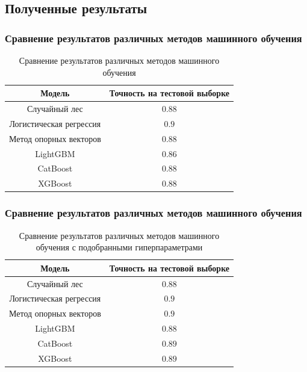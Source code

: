 \documentclass{beamer}
\begin{document}
		\subsection{Полученные результаты}
		\begin{frame}
			\frametitle{Сравнение результатов различных методов машинного обучения}
			\begin{center}
				\begin{table}[!htbp]
					\centering
					\begin{tabular}{ |c|c| }
						\hline
						Модель & Точность на тестовой выборке \\ 
						\hline
						Случайный лес & $0.88$  \\ 
						Логистическая регрессия & $0.9$ \\ 
						Метод опорных векторов & $0.88$  \\
						LightGBM & $0.86$ \\
						CatBoost & $0.88$ \\
						XGBoost & $0.88$  \\
						\hline
					\end{tabular}
					\caption{Сравнение результатов различных методов машинного обучения}
				\end{table}
			\end{center}
		\end{frame}
		\begin{frame}
			\frametitle{Сравнение результатов различных методов машинного обучения}
			\begin{center}
				\begin{table}[!htbp]
					\centering
					\begin{tabular}{ |c|c| }
						\hline
						Модель & Точность на тестовой выборке \\ 
						\hline
						Случайный лес & $0.88$  \\ 
						Логистическая регрессия & $0.9$ \\ 
						Метод опорных векторов & $0.9$  \\
						LightGBM & $0.88$ \\
						CatBoost & $0.89$ \\
						XGBoost & $0.89$  \\
						\hline
					\end{tabular}
					\caption{Сравнение результатов различных методов машинного обучения с подобранными гиперпараметрами}
				\end{table}
			\end{center}
		\end{frame}
\end{document}
